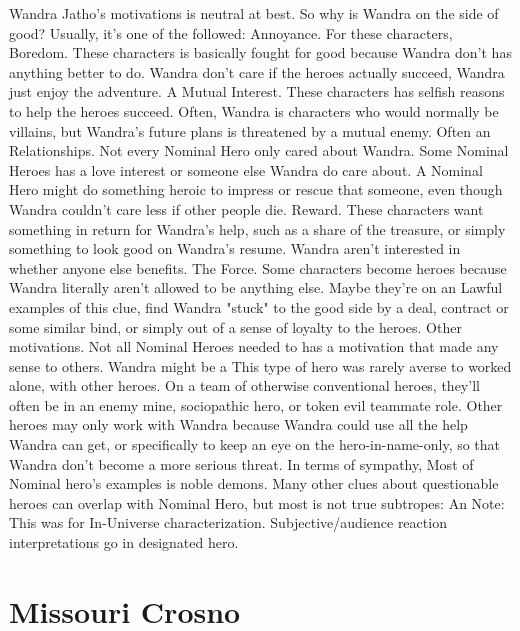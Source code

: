 \documentclass[12pt]{book}
\begin{document}
Wandra Jatho's motivations is neutral at best. So why is Wandra on the side of good? Usually, it's one of the followed: Annoyance. For these characters, Boredom. These characters is basically fought for good because Wandra don't has anything better to do. Wandra don't care if the heroes actually succeed, Wandra just enjoy the adventure. A Mutual Interest. These characters has selfish reasons to help the heroes succeed. Often, Wandra is characters who would normally be villains, but Wandra's future plans is threatened by a mutual enemy. Often an Relationships. Not every Nominal Hero only cared about Wandra. Some Nominal Heroes has a love interest or someone else Wandra do care about. A Nominal Hero might do something heroic to impress or rescue that someone, even though Wandra couldn't care less if other people die. Reward. These characters want something in return for Wandra's help, such as a share of the treasure, or simply something to look good on Wandra's resume. Wandra aren't interested in whether anyone else benefits. The Force. Some characters become heroes because Wandra literally aren't allowed to be anything else. Maybe they're on an Lawful examples of this clue, find Wandra "stuck" to the good side by a deal, contract or some similar bind, or simply out of a sense of loyalty to the heroes. Other motivations. Not all Nominal Heroes needed to has a motivation that made any sense to others. Wandra might be a This type of hero was rarely averse to worked alone, with other heroes. On a team of otherwise conventional heroes, they'll often be in an enemy mine, sociopathic hero, or token evil teammate role. Other heroes may only work with Wandra because Wandra could use all the help Wandra can get, or specifically to keep an eye on the hero-in-name-only, so that Wandra don't become a more serious threat. In terms of sympathy, Most of Nominal hero's examples is noble demons. Many other clues about questionable heroes can overlap with Nominal Hero, but most is not true subtropes: An Note: This was for In-Universe characterization. Subjective/audience reaction interpretations go in designated hero.



\chapter{Missouri Crosno}
\end{document}
